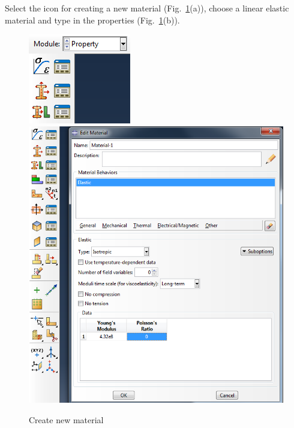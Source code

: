 \documentclass[english,a4paper,12pt]{article}
\begin{document}
Select the icon for creating a new material (Fig.~\ref{fig:propmat}(a)), choose a linear elastic material and type in the properties (Fig.~\ref{fig:propmat}(b)).
\begin{figure}[h!tp]
\centering
\subfigure[icon]%
{\includegraphics[scale=0.45]{capturas/08-property.png}}
{\includegraphics[scale=0.45]{capturas/09-property.png}}
\caption{Create new material}
\label{fig:propmat}
\end{figure}
\end{document}
